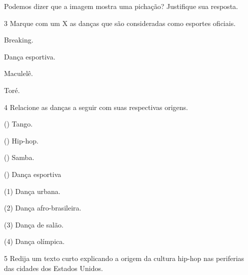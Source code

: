 Podemos dizer que a imagem mostra uma pichação? Justifique sua resposta.




\num{3}  Marque com um X as danças que são consideradas como esportes oficiais.

\begin{boxlist}
\item Breaking. 

\item Dança esportiva. 

\item Maculelê.

\item Toré.
\end{boxlist}


\num{4}  Relacione as danças a seguir com suas respectivas origens.

\begin{multicols}{2}
() Tango.

() Hip-hop.

() Samba.

() Dança esportiva

\columnbreak

(1) Dança urbana.

(2) Dança afro-brasileira.

(3) Dança de salão.

(4) Dança olímpica.
\end{multicols}


\num{5} Redija um texto curto explicando a origem da cultura hip-hop
nas periferias das cidades dos Estados Unidos.


